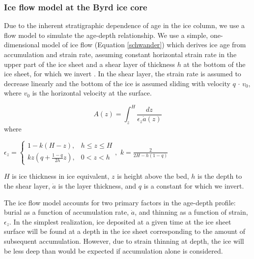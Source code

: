 \subsubsection{Ice flow model at the Byrd ice core}

Due to the inherent stratigraphic dependence of age in the ice column, we use a flow model to simulate the age-depth relationship. We use a simple, one-dimensional model of ice flow (Equation \ref{schwander}) which derives ice age from accumulation and strain rate, assuming constant horizontal strain rate in the upper part of the ice sheet and a shear layer of thickness $h$ at the bottom of the ice sheet, for which we invert \citep{schwander2001}. In the shear layer, the strain rate is assumed to decrease linearly and the bottom of the ice is assumed sliding with velocity $q$ $\cdot$ $v_0$, where $v_0$ is the horizontal velocity at the surface.

\begin{equation}\label{schwander}
A(z) = \int_{z}^{H} \frac{dz}{\epsilon_z \dot{a}(z)}
\end{equation}
where
\begin{center}
$    \epsilon_z=
    \begin{cases}
                 1-k(H-z), & h \leq z \leq H \\
                  kz(q+\frac{1-q}{2h}z), & 0 < z < h
    \end{cases}, 
$
$
k = \frac{2}{2H - h(1-q)}
$
\end{center}
$H$ is ice thickness in ice equivalent, $z$ is height above the bed, $h$ is the depth to the shear layer, $\dot{a}$ is the layer thickness, and $q$ is a constant for which we invert. 

The ice flow model accounts for two primary factors in the age-depth profile: burial as a function of accumulation rate, $\dot{a}$, and thinning as a function of strain, $\epsilon_z$. In the simplest realization, ice deposited at a given time at the ice sheet surface will be found at a depth in the ice sheet corresponding to the amount of subsequent accumulation. However, due to strain thinning at depth, the ice will be less deep than would be expected if accumulation alone is considered. 

